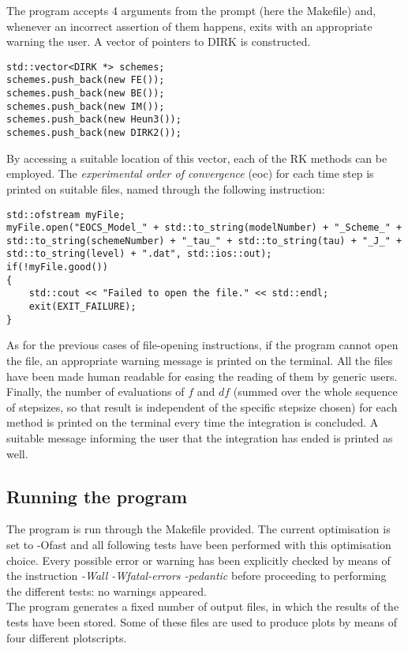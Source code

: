 \documentclass[11pt]{article}
\theoremstyle{theorem}
\theoremstyle{definition}
\begin{document}
The program accepts 4 arguments from the prompt (here the Makefile) and, whenever an incorrect assertion of them happens, exits with an appropriate warning the user. A vector of pointers to DIRK is constructed.\\

\begin{lstlisting}
std::vector<DIRK *> schemes;
schemes.push_back(new FE());
schemes.push_back(new BE());
schemes.push_back(new IM());
schemes.push_back(new Heun3());
schemes.push_back(new DIRK2());
\end{lstlisting}

By accessing a suitable location of this vector, each of the RK methods can be employed. The \emph{experimental order of convergence} (eoc) for each time step is printed on suitable files, named through the following instruction:

\begin{lstlisting}
std::ofstream myFile;
myFile.open("EOCS_Model_" + std::to_string(modelNumber) + "_Scheme_" + std::to_string(schemeNumber) + "_tau_" + std::to_string(tau) + "_J_" + std::to_string(level) + ".dat", std::ios::out);
if(!myFile.good())
{
	std::cout << "Failed to open the file." << std::endl;
	exit(EXIT_FAILURE);
}
\end{lstlisting}

As for the previous cases of file-opening instructions, if the program cannot open the file, an appropriate warning message is printed on the terminal. All the files have been made human readable for easing the reading of them by generic users.\\
Finally, the number of evaluations of $f$ and $df$ (summed over the whole sequence of stepsizes, so that result is independent of the specific stepsize chosen) for each method is printed on the terminal every time the integration is concluded. A suitable message informing the user that the integration has ended is printed as well.\\

\subsection{Running the program}
The program is run through the Makefile provided. The current optimisation is set to -Ofast and all following tests have been performed with this optimisation choice. Every possible error or warning has been explicitly checked by means of the instruction \emph{-Wall -Wfatal-errors -pedantic} before proceeding to performing the different tests: no warnings appeared.\\
The program generates a fixed number of output files, in which the results of the tests have been stored. Some of these files are used to produce plots by means of four different plotscripts.\\ 
\end{document}
